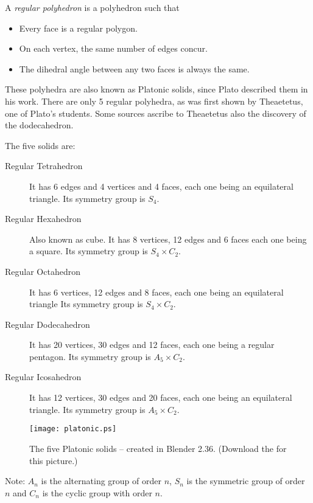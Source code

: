 \documentclass[12pt]{article}
\begin{document}
A \emph{regular polyhedron} is a polyhedron such that
\begin{itemize}
\item Every face is a regular polygon.
\item On each vertex, the same number of edges concur.
\item The dihedral angle between any two faces is always the same.
\end{itemize}

These polyhedra are also known as Platonic solids, since Plato described them in his work. There are only 5 regular polyhedra, as was first shown by Theaetetus, one of Plato's students. Some sources ascribe to Theaetetus also the discovery of the dodecahedron. 

The five solids are:
\begin{description}
\item[Regular Tetrahedron] It has 6 edges and 4 vertices and 4 faces, each one being an equilateral triangle. Its symmetry group is $S_4$.
\item[Regular Hexahedron] Also known as cube. It has 8 vertices, 12 edges and 6 faces each one being a square. Its symmetry group is $S_4\times C_2$.
\item[Regular Octahedron] It has 6 vertices, 12 edges and 8 faces, each one being an equilateral triangle Its symmetry group is $S_4\times C_2$.
\item[Regular Dodecahedron] It has 20 vertices, 30 edges and 12 faces, each one being a regular pentagon. Its symmetry group is $A_5\times C_2$.
\item[Regular Icosahedron] It has 12 vertices, 30 edges and 20 faces, each one being an equilateral triangle. Its symmetry group is $A_5\times C_2$.
\end{description}
\begin{figure}[h]
\begin{centering}
\texttt{[image: platonic.ps]}
\caption{The five Platonic solids -- created in Blender 2.36. (Download the  for this picture.)}
\end{centering}
\end{figure}

\small Note: $A_n$ is the alternating group of order $n$, $S_n$ is the symmetric group of order $n$ and $C_n$ is the cyclic group with order $n$.
\end{document}
